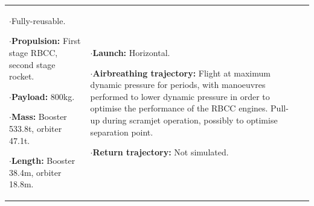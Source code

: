 {\begin{landscape}
\begin{xltabular}{\linewidth}{|X|X|X|}
	$\cdot$Fully-reusable. 
	
	$\cdot$\textbf{Propulsion:} First stage RBCC, second stage rocket. 
	
	$\cdot$\textbf{Payload:} 800kg.

	 $\cdot$\textbf{Mass:} Booster 533.8t, orbiter 47.1t.
	 
	 $\cdot$\textbf{Length:} Booster 38.4m, orbiter 18.8m. 
	 
	
	&\small
	
	$\cdot$\textbf{Launch:} Horizontal. 
	
	$\cdot$\textbf{Airbreathing trajectory:} Flight at maximum dynamic pressure for periods, with manoeuvres performed to lower dynamic pressure in order to optimise the performance of the RBCC engines. Pull-up during scramjet operation, possibly to optimise separation point.

	
	$\cdot$\textbf{Return trajectory:} Not simulated. 
	

\end{xltabular}
\end{landscape}}
